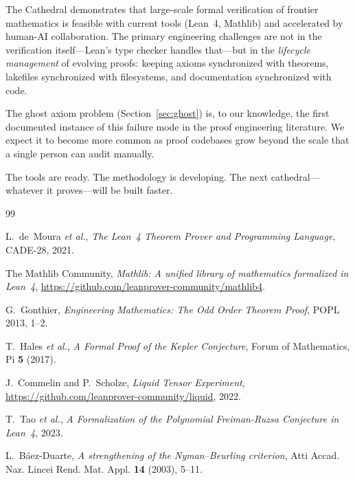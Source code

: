 \documentclass[11pt,a4paper]{article}
\theoremstyle{definition}
\begin{document}
The Cathedral demonstrates that large-scale formal verification of
frontier mathematics is feasible with current tools (Lean~4, Mathlib)
and accelerated by human-AI collaboration. The primary engineering
challenges are not in the verification itself---Lean's type checker
handles that---but in the \emph{lifecycle management} of evolving
proofs: keeping axioms synchronized with theorems, lakefiles
synchronized with filesystems, and documentation synchronized with
code.

The ghost axiom problem (Section~\ref{sec:ghost}) is, to our
knowledge, the first documented instance of this failure mode in the
proof engineering literature. We expect it to become more common as
proof codebases grow beyond the scale that a single person can audit
manually.

The tools are ready. The methodology is developing. The next
cathedral---whatever it proves---will be built faster.




\begin{thebibliography}{99}

L.~de~Moura \emph{et al.}, \emph{The Lean~4 Theorem Prover and Programming
Language}, CADE-28, 2021.

The Mathlib Community, \emph{Mathlib: A unified library of mathematics
formalized in Lean~4}, \url{https://github.com/leanprover-community/mathlib4}.

G.~Gonthier, \emph{Engineering Mathematics: The Odd Order Theorem Proof},
POPL 2013, 1--2.

T.~Hales \emph{et al.}, \emph{A Formal Proof of the Kepler Conjecture},
Forum of Mathematics, Pi \textbf{5} (2017).

J.~Commelin and P.~Scholze, \emph{Liquid Tensor Experiment},
\url{https://github.com/leanprover-community/liquid}, 2022.

T.~Tao \emph{et al.}, \emph{A Formalization of the Polynomial
Freiman-Ruzsa Conjecture in Lean~4}, 2023.

L.~B\'aez-Duarte, \emph{A strengthening of the Nyman--Beurling criterion},
Atti Accad. Naz. Lincei Rend. Mat. Appl. \textbf{14} (2003), 5--11.

\end{thebibliography}
\end{document}
